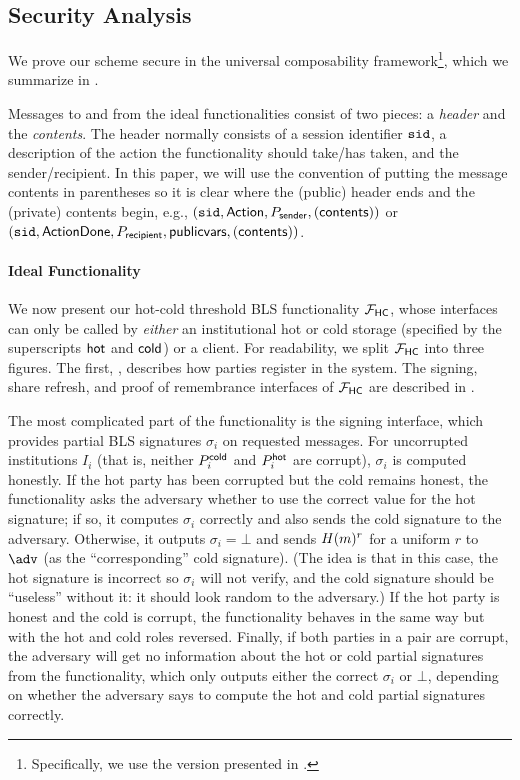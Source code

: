 \subsection{Security Analysis}\label{sec:security}

We prove our scheme secure in the universal composability framework\footnote{Specifically, we use the version presented in \cite{EPRINT:CLOS02}.}, which we summarize in .

Messages to and from the ideal functionalities consist of two pieces: a \emph{header} and the \emph{contents}. The header normally consists of a session identifier $\texttt{sid}$, a description of the action the functionality should take/has taken, and the sender/recipient. In this paper, we will use the convention of putting the message contents in parentheses so it is clear where the (public) header ends and the (private) contents begin, e.g., $(\texttt{sid}, \mathsf{Action}, P_{\sf sender}, (\mathsf{contents}))$ or $(\texttt{sid}, \mathsf{ActionDone}, P_{\sf recipient}, \mathsf{publicvars}, (\mathsf{contents}))$.

\paragraph{Ideal Functionality}




We now present our hot-cold threshold BLS functionality $\mathcal{F}_\mathsf{HC}$, whose interfaces can only be called by \emph{either} an institutional hot or cold storage (specified by the superscripts $\mathsf{hot}$ and $\mathsf{cold}$) or a client. For readability, we split $\mathcal{F}_\mathsf{HC}$ into three figures. The first, , describes how parties register in the system.
The signing, share refresh, and proof of remembrance interfaces of $\mathcal{F}_\mathsf{HC}$ are described in .

The most complicated part of the functionality is the signing interface, which provides partial BLS signatures $\sigma_i$ on requested messages. For uncorrupted institutions $I_i$ (that is, neither $P_i^{\mathsf{cold}}$ and $P_i^{\mathsf{hot}}$ are corrupt), $\sigma_i$ is computed honestly.
If the hot party has been corrupted but the cold remains honest, the functionality asks the adversary whether to use the correct value for the hot signature; if so, it computes $\sigma_i$ correctly and also sends the cold signature to the adversary. Otherwise, it outputs $\sigma_i = \bot$ and sends $H(m)^r$ for a uniform $r$ to $\adv$ (as the ``corresponding'' cold signature). (The idea is that in this case, the hot signature is incorrect so $\sigma_i$ will not verify, and the cold signature should be ``useless'' without it: it should look random to the adversary.) 
If the hot party is honest and the cold is corrupt, the functionality behaves in the same way but with the hot and cold roles reversed. 
Finally, if both parties in a pair are corrupt, the adversary will get no information about the hot or cold partial signatures from the functionality, which only outputs either the correct $\sigma_i$ or $\bot$, depending on whether the adversary says to compute the hot and cold partial signatures correctly.

